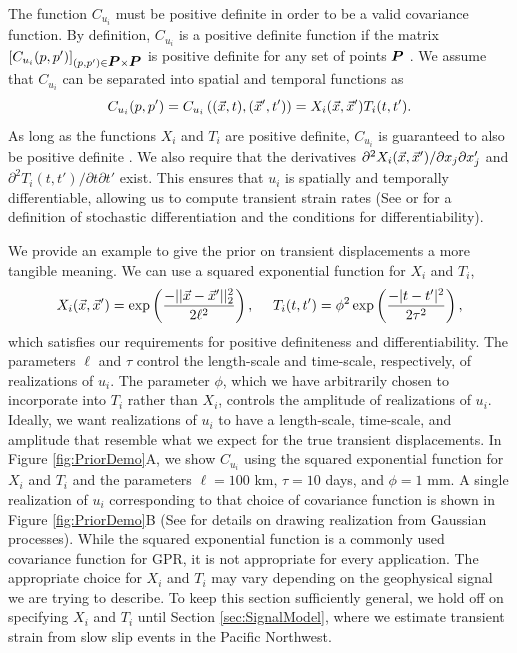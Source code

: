 \documentclass[extra,mreferee]{gji}
\begin{document}

The function $C_{u_i}$ must be positive definite in order to be a
valid covariance function. By definition, $C_{u_i}$ is a positive
definite function if the matrix $[C_{u_i}(p,p')]_{(p,p') \in \points
\times \points}$ is positive definite for any set of points $\points$
\citep[sec. 2.5]{Cressie1992}. We assume that $C_{u_i}$ can be
separated into spatial and temporal functions as
\begin{equation}\label{eq:TransientCovariance}
C_{u_i}(p,p') = C_{u_i}\left((\vec{x},t),(\vec{x}',t')\right) 
              = X_i(\vec{x},\vec{x}')T_i(t,t').
\end{equation}   
As long as the functions $X_i$ and $T_i$ are positive definite,
$C_{u_i}$ is guaranteed to also be positive definite \citep[sec.
4.2.4]{Rasmussen2006}. We also require that the derivatives
$\partial^2 X_i(\vec{x},\vec{x}')/ \partial x_j \partial x_j'$ and
$\partial^2 T_i(t,t') / \partial t \partial t'$ exist. This ensures
that $u_i$ is spatially and temporally differentiable, allowing us to
compute transient strain rates (See \citet[sec. 2.2]{Adler1981} or
\citet[appx. 10A]{Papoulis1991} for a definition of stochastic
differentiation and the conditions for differentiability).


We provide an example to give the prior on transient displacements a
more tangible meaning. We can use a squared exponential function for
$X_i$ and $T_i$,
\begin{equation}\label{eq:ExampleCov}
X_i(\pos,\pos') = \exp\left(\frac{-||\pos - \pos'||_2^2}{2\ell^2}\right), \ \ \ \ 
T_i(t,t') = \phi^2 \exp\left(\frac{-|t - t'|^2}{2\tau^2}\right),
\end{equation}
which satisfies our requirements for positive definiteness and
differentiability. The parameters $\ell$ and $\tau$ control the
length-scale and time-scale, respectively, of realizations of $u_i$.
The parameter $\phi$, which we have arbitrarily chosen to incorporate
into $T_i$ rather than $X_i$, controls the amplitude of realizations
of $u_i$. Ideally, we want realizations of $u_i$ to have a
length-scale, time-scale, and amplitude that resemble what we expect
for the true transient displacements. In Figure \ref{fig:PriorDemo}A,
we show $C_{u_i}$ using the squared exponential function for $X_i$ and
$T_i$ and the parameters $\ell = 100$ km, $\tau = 10$ days, and $\phi
= 1$ mm. A single realization of $u_i$ corresponding to that choice of
covariance function is shown in Figure \ref{fig:PriorDemo}B (See
\citet[appx. A.2]{Rasmussen2006} for details on drawing realization from
Gaussian processes). While the squared exponential function is a
commonly used covariance function for GPR, it is not appropriate for
every application. The appropriate choice for $X_i$ and $T_i$ may vary
depending on the geophysical signal we are trying to describe. To keep
this section sufficiently general, we hold off on specifying $X_i$ and
$T_i$ until Section \ref{sec:SignalModel}, where we estimate transient
strain from slow slip events in the Pacific Northwest.
\end{document}
